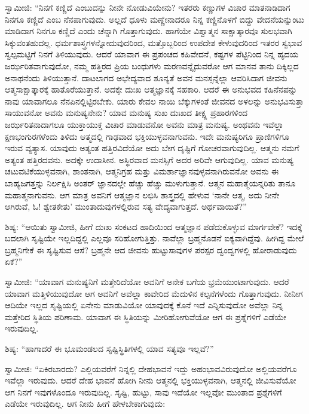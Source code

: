  ಸ್ವಾಮೀಜಿ: “ನಿನಗೆ ಕಣ್ಣಿದೆ ಎಂಬುದನ್ನು ನೀನೇ ನೋಡುವಿಯೇನು? ಇತರರು ಕಣ್ಣುಗಳ ವಿಚಾರ ಮಾತನಾಡಿದಾಗ ನಿನಗೂ ಕಣ್ಣಿದೆ ಎಂಬ ನೆನಪಾಗುವುದು. ಅಲ್ಲದೆ ಧೂಳು ಮಣ್ಣೇನಾದರೂ ನಿನ್ನ ಕಣ್ಣಿನೊಳಗೆ ಬಿದ್ದು ವೇದನೆಯನ್ನುಂಟು ಮಾಡಿದಾಗ ನಿನಗೂ ಕಣ್ಣಿದೆ ಎಂದು ಚೆನ್ನಾಗಿ ಗೊತ್ತಾಗುವುದು. ಹಾಗೆಯೇ ವಿಶ್ವಾತ್ಮನ ಸಾಕ್ಷಾತ್ಕಾರವೂ ಸುಲಭವಾಗಿ ಸಿಕ್ಕುವಂತಹುದಲ್ಲ. ಧರ್ಮಶಾಸ್ತ್ರಗಳನ್ನೋದುವುದರಿಂದ, ಮತ್ತೊಬ್ಬರಿಂದ ಉಪದೇಶ ಕೇಳುವುದರಿಂದ ಇತರರ ಸ್ವಭಾವ ಸ್ವಲ್ಪಮಟ್ಟಿಗೆ ನಿನಗೆ ತಿಳಿಯುವುದು. ಆದರೆ ಯಾವಾಗ ಈ ಪ್ರಪಂಚದ ಕಹಿವೇದನೆ, ಕಷ್ಟಗಳ ಪೆಟ್ಟಿನಿಂದ ನಿನ್ನ ಹೃದಯ ಜರ್ಝರಿತವಾಗುವುದೋ, ನಮ್ಮ ಹತ್ತಿರದ ಪ್ರಿಯ ಬಂಧುಗಳು ಮರಣವನ್ನೈದುವರೋ ಆಗ ಮಾನವ ತಾನು ದಿಕ್ಕಿಲ್ಲದ ಅನಾಥನೆಂದು ತಿಳಿಯುತ್ತಾನೆ. ದಾಟಲಾಗದ ಅಭೇದ್ಯವಾದ ಶೂನ್ಯತೆ ಅವನ ಮನಸ್ಸನ್ನೆಲ್ಲಾ ಆವರಿಸಿದಾಗ ಜೀವನು ಆತ್ಮಸಾಕ್ಷಾತ್ಕಾರಕ್ಕೆ ಹಾತೊರೆಯುತ್ತಾನೆ. ಅದಕ್ಕೇ ದುಃಖ ಆತ್ಮಜ್ಞಾನಕ್ಕೆ ಸಹಕಾರಿ. ಆದರೆ ಈ ಅನುಭವದ ಕಹಿನೆನಪನ್ನು ನಾವು ಯಾವಾಗಲೂ ನೆನಪಿನಲ್ಲಿಟ್ಟಿರಬೇಕು. ಯಾರು ಕೇವಲ ನಾಯಿ ಬೆಕ್ಕುಗಳಂತೆ ಜೀವನದ ಅಳಲನ್ನು ಅನುಭವಿಸುತ್ತಾ ಸಾಯುವನೋ ಅವನು ಮನುಷ್ಯನೇನು? ಯಾವ ಮನುಷ್ಯ ಸುಖ ದುಃಖದ ತೀಕ್ಷ್ಣ ಪ್ರಹಾರಗಳಿಂದ ಜರ್ಝರಿತನಾದಾಗಲೂ ಯುಕ್ತಾಯುಕ್ತ ವಿಚಾರ ಮಾಡುವನೋ ಅವನು ಮಾತ್ರ ಮನುಷ್ಯ. ಅಂಥವನು ಇವೆಲ್ಲಾ ಕ್ಷಣಭಂಗುರಗಳೆಂದು ತಿಳಿದು ಆತ್ಮದಲ್ಲಿ ಗಾಢವಾದ ಭಕ್ತಿಯುಳ್ಳವನಾಗುವನು. ಇದೇ ಮನುಷ್ಯರಿಗೂ ಪ್ರಾಣಿಗಳಿಗೂ ಇರುವ ವ್ಯತ್ಯಾಸ. ಯಾವುದು ಅತ್ಯಂತ ಹತ್ತಿರವಿದೆಯೋ ಅದು ಬೇಗ ದೃಷ್ಟಿಗೆ ಗೋಚರವಾಗುವುದಿಲ್ಲ. ಆತ್ಮನು ನಮಗೆ ಅತ್ಯಂತ ಹತ್ತಿರದವನು. ಅದಕ್ಕೇ ಉದಾಸೀನ. ಅಸ್ಥಿರವಾದ ಮನಸ್ಸಿಗೆ ಅದರ ಅರಿವೇ ಆಗುವುದಿಲ್ಲ. ಯಾವ ಮನುಷ್ಯ ಚಟುವಟಿಕೆಯುಳ್ಳವನಾಗಿ, ಶಾಂತನಾಗಿ, ಆತ್ಮನಿಗ್ರಹ ಮತ್ತು ವಿಮರ್ಶಾಜ್ಞಾನವುಳ್ಳವನಾಗಿರುವನೋ ಅವನು ಈ ಬಾಹ್ಯಜಗತ್ತನ್ನು ನಿರ್ಲಕ್ಷಿಸಿ ಅಂತರ್‌ ಜ್ಞಾನದಲ್ಲೇ ಹೆಚ್ಚು ಹೆಚ್ಚು ಮುಳುಗುತ್ತಾನೆ. ಆತ್ಮನ ಮಹಾತ್ಮೆಯನ್ನರಿತು ತಾನೂ ಮಹಾತ್ಮನಾಗುವನು. ಆಗ ಮಾತ್ರ ಅವನಿಗೆ ಆತ್ಮಜ್ಞಾನ ಲಭಿಸಿ ಶಾಸ್ತ್ರದಲ್ಲಿ ಹೇಳುವ ‘ನಾನೇ ಆತ್ಮ, ಅದು ನೀನೇ ಆಗಿರುವೆ, ಓ! ಶ್ವೇತಕೇತು’ ಮುಂತಾದುವುಗಳಲ್ಲಿರುವ ಸತ್ಯ ವೇದ್ಯವಾಗುತ್ತದೆ. ಅರ್ಥವಾಯಿತೆ?” 

 ಶಿಷ್ಯ: “ಆಯಿತು ಸ್ವಾಮೀಜಿ, ಹೀಗೆ ದುಃಖ ಸಂಕಟದ ಹಾದಿಯಿಂದ ಆತ್ಮಜ್ಞಾನ ಪಡೆದುಕೊಳ್ಳುವ ಮಾರ್ಗವೇಕೆ? ಇದಕ್ಕೆ ಬದಲಾಗಿ ಸೃಷ್ಟಿಯೇ ಇಲ್ಲದಿದ್ದಲ್ಲಿ ಎಲ್ಲವೂ ಸರಿಹೋಗುತ್ತಿತ್ತು. ನಾವೆಲ್ಲಾ ಬ್ರಹ್ಮನೊಡನೆ ಐಕ್ಯವಾಗಿದ್ದೆವು. ಹೀಗಿದ್ದ ಮೇಲೆ ಬ್ರಹ್ಮನಿಗೇಕೆ ಈ ಸೃಷ್ಟಿಸುವ ಆಸೆ? ಬ್ರಹ್ಮನೇ ಆದ ಜೀವನು ಹುಟ್ಟುಸಾವುಗಳ ಪರಸ್ಪರ ದ್ವಂದ್ವಗಳಲ್ಲಿ ಹೋರಾಡುವುದು ಏಕೆ?” 

 ಸ್ವಾಮೀಜಿ: “ಯಾವಾಗ ಮನುಷ್ಯನಿಗೆ ಮತ್ತೇರಿದೆಯೋ ಅವನಿಗೆ ಅನೇಕ ಬಗೆಯ ಭ್ರಮೆಯುಂಟಾಗುವುದು. ಆದರೆ ಯಾವಾಗ ಮತ್ತಿಳಿಯುವುದೋ ಆಗ ಅವನಿಗೆ ಅವೆಲ್ಲಾ ಕಾವೇರಿದ ಮೆದುಳಿನ ಕಲ್ಪನೆಗಳೆಂದು ಗೊತ್ತಾಗುವುದು. ನೀನೀಗ ಆದಿಯೇ ಇಲ್ಲದ ಸೃಷ್ಟಿಯಲ್ಲಿ ಏನೇನು ಮಾಡುವಿಯೋ ಯಾವುದಕ್ಕೆ ಕೊನೆ ಇದೆ ಎನ್ನಿಸುವುದೋ ಅವೆಲ್ಲಾ ನಿನ್ನ ಮತ್ತೇರಿದ ಸ್ಥಿತಿಯ ಪರಿಣಾಮ. ಯಾವಾಗ ಈ ಸ್ಥಿತಿಯನ್ನು ಮೀರಿಹೋಗುವೆಯೋ ಆಗ ಈ ಪ್ರಶ್ನೆಗಳಿಗೆ ಎಡೆಯೇ ಇರುವುದಿಲ್ಲ. 

 ಶಿಷ್ಯ: “ಹಾಗಾದರೆ ಈ ಭೂಮಂಡಲದ ಸೃಷ್ಟಿಸ್ಥಿತಿಗಳಲ್ಲಿ ಯಾವ ಸತ್ಯವೂ ಇಲ್ಲವೆ?” 

 ಸ್ವಾಮೀಜಿ: “ಏಕಿರಬಾರದು? ಎಲ್ಲಿಯವರೆಗೆ ನಿನ್ನಲ್ಲಿ ದೇಹಭಾವನೆ ಇದ್ದು ಅಹಂಭಾವವಿರುವುದೋ ಅಲ್ಲಿಯವರೆಗೂ ಇವೆಲ್ಲಾ ಇರುವುದು. ಆದರೆ ದೇಹ ಭಾವನೆ ಹೋಗಿ ನೀನು ಆತ್ಮನಲ್ಲಿ ಭಕ್ತಿಯುಳ್ಳವನಾಗಿ, ಆತ್ಮನಲ್ಲಿ ಜೀವಿಸುವೆಯೋ ಆಗ ನಿನಗೆ ಇವುಗಳೊಂದೂ ಇರುವುದಿಲ್ಲ. ಸೃಷ್ಟಿ, ಹುಟ್ಟು, ಸಾವು ಇದೆಯೋ ಇಲ್ಲವೋ ಮುಂತಾದ ಪ್ರಶ್ನೆಗಳಿಗೆ ಎಡೆಯೇ ಇರುವುದಿಲ್ಲ. ಆಗ ನೀನು ಹೀಗೆ ಹೇಳಬೇಕಾಗುವುದು:

